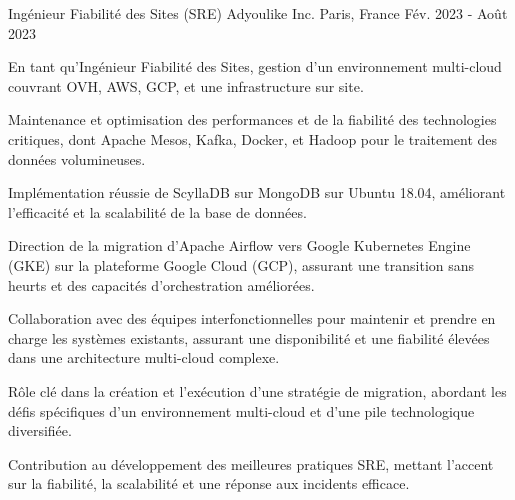 \begin{cventries}
\cventry
{Ingénieur Fiabilité des Sites (SRE)} %
{Adyoulike Inc.} %
{Paris, France} %
{Fév. 2023 - Août 2023} %
{
  \begin{cvitems} %
    \item {En tant qu'Ingénieur Fiabilité des Sites, gestion d'un environnement multi-cloud couvrant OVH, AWS, GCP, et une infrastructure sur site.}
    \item {Maintenance et optimisation des performances et de la fiabilité des technologies critiques, dont Apache Mesos, Kafka, Docker, et Hadoop pour le traitement des données volumineuses.}
    \item {Implémentation réussie de ScyllaDB sur MongoDB sur Ubuntu 18.04, améliorant l'efficacité et la scalabilité de la base de données.}
    \item {Direction de la migration d'Apache Airflow vers Google Kubernetes Engine (GKE) sur la plateforme Google Cloud (GCP), assurant une transition sans heurts et des capacités d'orchestration améliorées.}
    \item {Collaboration avec des équipes interfonctionnelles pour maintenir et prendre en charge les systèmes existants, assurant une disponibilité et une fiabilité élevées dans une architecture multi-cloud complexe.}
    \item {Rôle clé dans la création et l'exécution d'une stratégie de migration, abordant les défis spécifiques d'un environnement multi-cloud et d'une pile technologique diversifiée.}
    \item {Contribution au développement des meilleures pratiques SRE, mettant l'accent sur la fiabilité, la scalabilité et une réponse aux incidents efficace.}
  \end{cvitems}
}


\end{cventries}
